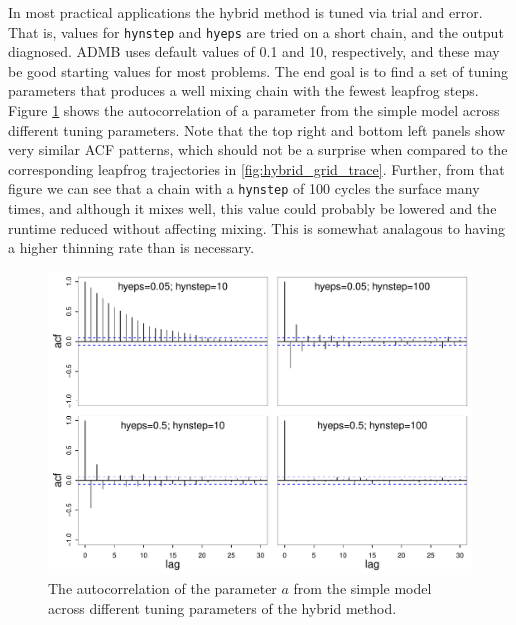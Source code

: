 \documentclass{article}\usepackage[]{graphicx}\usepackage[]{color}
\begin{document}
In most practical applications the hybrid method is tuned via trial and
error. That is, values for \texttt{hynstep} and \texttt{hyeps} are tried on
a short chain, and the output diagnosed. ADMB uses default values of 0.1
and 10, respectively, and these may be good starting values for most
problems. The end goal is to find a set of tuning parameters that produces
a well mixing chain with the fewest leapfrog steps. Figure
\ref{fig:hybrid_grid_acf} shows the autocorrelation of a parameter from the
simple model across different tuning parameters. Note that the top right
and bottom left panels show very similar ACF patterns, which should not be
a surprise when compared to the corresponding leapfrog trajectories in
\ref{fig:hybrid_grid_trace}. Further, from that figure we can see that a
chain with a \texttt{hynstep} of 100 cycles the surface many times, and
although it mixes well, this value could probably be lowered and the
runtime reduced without affecting mixing. This is somewhat analagous to
having a higher thinning rate than is necessary.

\begin{figure}[h]
  \centering
  \includegraphics[width=5in]{../plots/hybrid_grid_acf.pdf}
  \caption{The autocorrelation of the parameter $a$ from the simple model
    across different tuning parameters of the hybrid method.}
  \label{fig:hybrid_grid_acf}
\end{figure}
\end{document}
